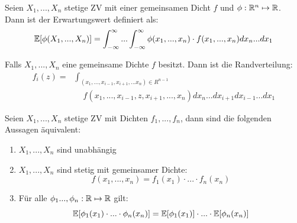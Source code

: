 \Satz Seien $X_1,...,X_n$ stetige ZV mit einer gemeinsamen Dicht $f$ und $\phi: \mathbb{R}^n \mapsto \mathbb{R}$. Dann ist der Erwartungswert definiert als:
$$\mathbb{E}[\phi(X_1, ..., X_n)] = \int_{-\infty}^\infty ... \int_{-\infty}^\infty \phi(x_1, ...,x_n) \cdot f(x_1,...,x_n) dx_n...dx_1$$

\Satz Falls $X_1,...,X_n$ eine gemeinsame Dichte $f$ besitzt. Dann ist die Randverteilung:
\begin{align*}
    f_i(z) =& \int_{(x_1, ..., x_{i-1},x_{i+1},...x_n) \in R^{n-1}} \\ 
    & \quad f(x_1,...,x_{i-1},z,x_{i+1},...,x_n)dx_n...dx_{i+1}dx_{i-1}...dx_1
\end{align*}

\Satz Seien $X_1,...,X_n$ stetige ZV mit Dichten $f_1,..., f_n$, dann sind die folgenden Aussagen äquivalent:
\begin{enumerate}
    \item $X_1,...,X_n$ sind unabhängig
    
    \item $X_1,...,X_n$ sind stetig mit gemeinsamer Dichte: 
    $$f(x_1,...,x_n) = f_1(x_1) \cdot ... \cdot f_n(x_n)$$
    
    \item Für alle $\phi_1...,\phi_n : \mathbb{R} \mapsto \mathbb{R}$ gilt:
    $$\mathbb{E}[\phi_1(x_1) \cdot ... \cdot \phi_n(x_n)] = \mathbb{E}[\phi_1(x_1)] \cdot ... \cdot \mathbb{E}[\phi_n(x_n)]$$
\end{enumerate}